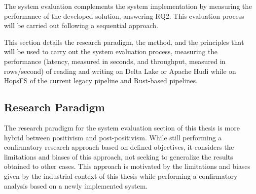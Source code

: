 The system evaluation complements the system implementation by measuring the performance of the developed solution, answering RQ2. This evaluation process will be carried out following a sequential approach.

This section details the research paradigm, the method, and the principles that will be used to carry out the system evaluation process, measuring the performance (latency, measured in seconds, and throughput, measured in rows/second) of reading and writing on Delta Lake or Apache Hudi while on \gls{HopsFS} of the current legacy pipeline and Rust-based pipelines. 

\subsection{Research Paradigm}
The research paradigm for the system evaluation section of this thesis is more hybrid between positivism and post-positivism. While still performing a confirmatory research approach based on defined objectives, it considers the limitations and biases of this approach, not seeking to generalize the results obtained to other cases. This approach is motivated by the limitations and biases given by the industrial context of this thesis while performing a confirmatory analysis based on a newly implemented system.

